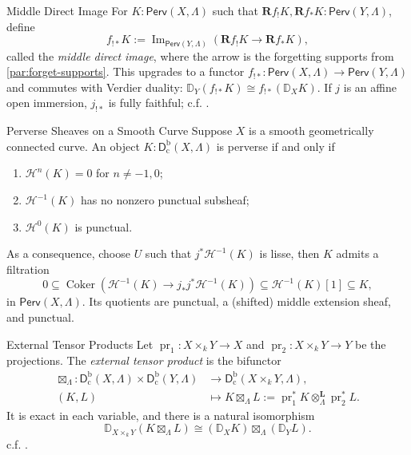 \documentclass[11pt,letterpaper]{article}
\theoremstyle{numberfirstplain}
\numberwithin{equation}{theorem}
\theoremstyle{numberfirstupright}
\begin{document}
\begin{custom}{Middle Direct Image}\label{def:middle-direct-image}
For $K:\mathsf{Perv}(X,\Lambda)$ such that $\mathbf Rf_!K,\mathbf Rf_*K:\mathsf{Perv}(Y,\Lambda)$, define 
\[
f_{!*}K:=\operatorname{Im}_{\mathsf{Perv}(Y,\Lambda)}
\left(\mathbf Rf_!K\longrightarrow\mathbf Rf_*K\right),
\]
called the \textit{middle direct image}, where the arrow is the forgetting supports from \cref{par:forget-supports}. 
This upgrades to a functor $f_{!*}:\mathsf{Perv}(X,\Lambda)\rightarrow \mathsf{Perv}(Y,\Lambda)$ and commutes with Verdier duality:
$
\mathbb D_Y(f_{!*}K)\cong f_{!*}(\mathbb D_XK).
$
If $j$ is an affine open immersion,  $j_{!*}$ is fully faithful; c.f. \cite[\S2.3.3.1]{Katz1996}.
\end{custom}
\begin{custom}{Perverse Sheaves on a Smooth Curve}\label{fact:perverse-sheaves-on-smooth-curve}
Suppose $X$ is a smooth geometrically connected curve. An object $K:\mathsf D_{\mathrm c}^{\mathrm b}(X,\Lambda)$ is perverse if and only if
\begin{enumerate}
  \item $\mathcal H^n(K)=0$ for $n\ne-1,0$;
  \item $\mathcal H^{-1}(K)$ has no nonzero punctual subsheaf;
  \item $\mathcal H^0(K)$ is punctual.
\end{enumerate}
As a consequence, choose $U$ such that $j^*\mathcal H^{-1}(K)$ is lisse, then $K$ admits a filtration 
\[
0\subseteq
\operatorname{Coker}\!\left(\mathcal H^{-1}(K)\longrightarrow j_*j^*\mathcal H^{-1}(K)\right)
\subseteq\mathcal H^{-1}(K)[1]\subseteq K,
\]
in $\mathsf{Perv}(X,\Lambda)$. Its quotients are punctual, a (shifted) middle extension sheaf, and punctual. 
\end{custom}


\begin{custom}{External Tensor Products}\label{def:external-tensor-product}
Let $\operatorname{pr}_1:X\times_kY\to X$ and $\operatorname{pr}_2:X\times_kY\to Y$ be the projections.
The \textit{external tensor product} is the bifunctor
\[
\begin{aligned}
\boxtimes_\Lambda:\mathsf D_{\mathrm c}^{\mathrm b}(X,\Lambda)\times\mathsf D_{\mathrm c}^{\mathrm b}(Y,\Lambda)
&\longrightarrow\mathsf D_{\mathrm c}^{\mathrm b}(X\times_kY,\Lambda),\\
(K,L)&\longmapsto K\boxtimes_\Lambda L
:=\operatorname{pr}_1^*K\otimes_\Lambda^{\mathbf L}\operatorname{pr}_2^*L.
\end{aligned}
\]
It is exact in each variable, and there is a natural isomorphism
\[
\mathbb D_{X\times_kY}(K\boxtimes_\Lambda L)
\cong
(\mathbb D_XK)\boxtimes_\Lambda(\mathbb D_YL).
\]
c.f. \cite[\S2.2.2]{Katz1996}.
\end{custom}
\end{document}
